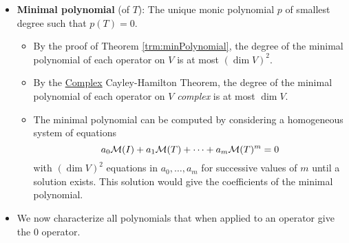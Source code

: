 \documentclass[../main.tex]{subfiles}
\begin{document}
\begin{itemize}
\begin{theorem}
\begin{proof}
            \begin{equation*}
                a_0I+a_1T+a_2T^2+\cdots+a_{m-1}T^{m-1}+T^m = 0
            \end{equation*}
            Therefore, if we consider the monic polynomial $p\in\pol{\F}$ defined by
            \begin{equation*}
                p(z) = a_0+a_1z+a_2z^2+\cdots+a_{m-1}z^{m-1}+z^m
            \end{equation*}
            we know by the above that $p(T)=0$.\par
            Suppose for the sake of contradiction that there exists a monic polynomial $q\in\pol{\F}$ of degree less than or equal to $m$ such that $q(T)=0$. If $\deg q<m$, then $I,T,T^2,\dots,T^{\deg q}$ will be linearly independent, so $q(z)=0$. But this implies the highest degree coefficient of $q$ is not 1, so $q$ is not monic, a contradiction. On the other hand, if $\deg q=m$, then we have that $(p-q)(T)=0$ as well. However, since both $p$ and $z$ have a $1z^m$ term that cancels in $p-q$, $\deg(p-q)<m$. Thus, we can reach the same contradiction in the other case.
        \end{proof}
    \end{theorem}
    \item \textbf{Minimal polynomial} (of $T$): The unique monic polynomial $p$ of smallest degree such that $p(T)=0$.
    \begin{itemize}
        \item By the proof of Theorem \ref{trm:minPolynomial}, the degree of the minimal polynomial of each operator on $V$ is at most $(\dim V)^2$.
        \item By the \hyperref[trm:ComplexCayleyHamilton]{Complex} Cayley-Hamilton Theorem, the degree of the minimal polynomial of each operator on $V$ \emph{complex} is at most $\dim V$.
        \item The minimal polynomial can be computed by considering a homogeneous system of equations
        \begin{equation*}
            a_0\mathcal{M}(I)+a_1\mathcal{M}(T)+\cdots+a_m\mathcal{M}(T)^m = 0
        \end{equation*}
        with $(\dim V)^2$ equations in $a_0,\dots,a_m$ for successive values of $m$ until a solution exists. This solution would give the coefficients of the minimal polynomial.
    \end{itemize}
    \item We now characterize all polynomials that when applied to an operator give the 0 operator.

\end{itemize}
\end{document}
